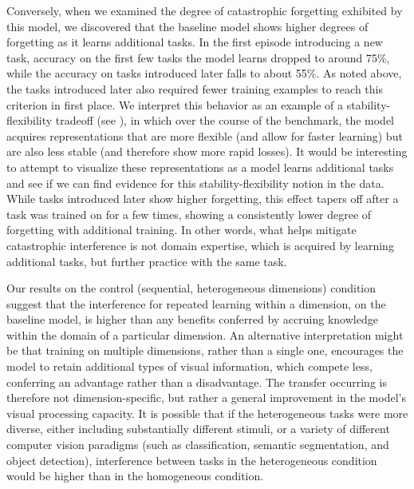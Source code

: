 Conversely, when we examined the degree of catastrophic forgetting exhibited by this model, we discovered that the baseline model shows higher degrees of forgetting as it learns additional tasks. In the first episode introducing a new task, accuracy on the first few tasks the model learns dropped to around 75\%, while the accuracy on tasks introduced later falls to about 55\%. As noted above, the tasks introduced later also required fewer training examples to reach this criterion in first place. We interpret this behavior as an example of a stability-flexibility tradeoff (see \cite{Hermundstad2011}), in which over the course of the benchmark, the model acquires representations that are more flexible (and allow for faster learning) but are also less stable (and therefore show more rapid losses). It would be interesting to attempt to visualize these representations as a model learns additional tasks and see if we can find evidence for this stability-flexibility notion in the data. While tasks introduced later show higher forgetting, this effect tapers off after a task was trained on for a few times, showing a consistently lower degree of forgetting with additional training. In other words, what helps mitigate catastrophic interference is not domain expertise, which is acquired by learning additional tasks, but further practice with the same task. 

Our results on the control (sequential, heterogeneous dimensions) condition suggest that the interference for repeated learning within a dimension, on the baseline model, is higher than any benefits conferred by accruing knowledge within the domain of a particular dimension. An alternative interpretation might be that training on multiple dimensions, rather than a single one, encourages the model to retain additional types of visual information, which compete less, conferring an advantage rather than a disadvantage. The transfer occurring is therefore not dimension-specific, but rather a general improvement in the model's visual processing capacity. It is possible that if the heterogeneous tasks were more diverse, either including substantially different stimuli, or a variety of different computer vision paradigms (such as classification, semantic segmentation, and object detection), interference between tasks in the heterogeneous condition would be higher than in the homogeneous condition.

